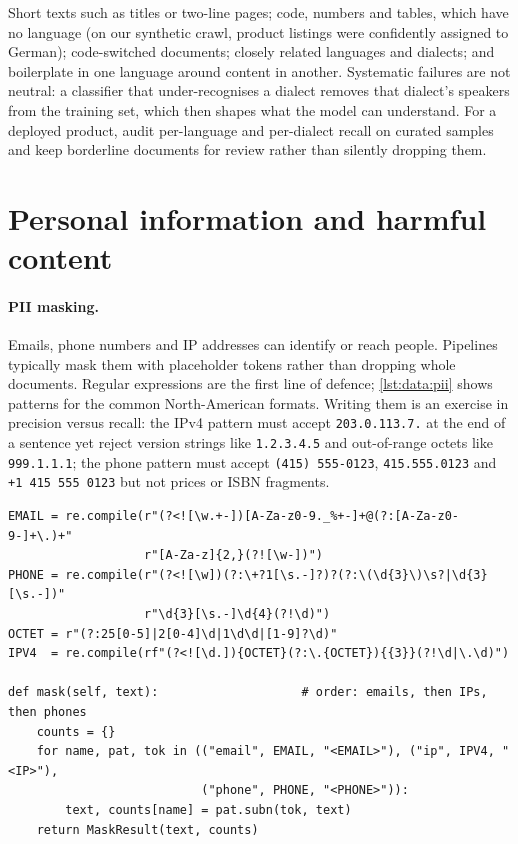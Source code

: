 \begin{pitfall}
Short texts such as titles or two-line pages; code, numbers and tables, which have no language (on
our synthetic crawl, product listings were confidently assigned to German); code-switched documents;
closely related languages and dialects; and boilerplate in one language around content in another.
Systematic failures are not neutral: a classifier that under-recognises a dialect removes that
dialect's speakers from the training set, which then shapes what the model can understand. For a
deployed product, audit per-language and per-dialect recall on curated samples and keep
borderline documents for review rather than silently dropping them.
\end{pitfall}

\section{Personal information and harmful content}\label{sec:data:pii}

\paragraph{PII masking.} Emails, phone numbers and IP addresses can identify or reach people.
Pipelines typically mask them with placeholder tokens rather than dropping whole documents.
Regular expressions are the first line of defence; \cref{lst:data:pii} shows patterns for the
common North-American formats. Writing them is an exercise in precision versus recall: the IPv4
pattern must accept \texttt{203.0.113.7.} at the end of a sentence yet reject version strings
like \texttt{1.2.3.4.5} and out-of-range octets like \texttt{999.1.1.1}; the phone pattern must
accept \texttt{(415) 555-0123}, \texttt{415.555.0123} and \texttt{+1 415 555 0123} but not
prices or ISBN fragments.

\begin{lstlisting}[caption={Conservative PII regexes (from \code{llmsys/datapipe/pii.py}).},label={lst:data:pii}]
EMAIL = re.compile(r"(?<![\w.+-])[A-Za-z0-9._%+-]+@(?:[A-Za-z0-9-]+\.)+"
                   r"[A-Za-z]{2,}(?![\w-])")
PHONE = re.compile(r"(?<![\w])(?:\+?1[\s.-]?)?(?:\(\d{3}\)\s?|\d{3}[\s.-])"
                   r"\d{3}[\s.-]\d{4}(?!\d)")
OCTET = r"(?:25[0-5]|2[0-4]\d|1\d\d|[1-9]?\d)"
IPV4  = re.compile(rf"(?<![\d.]){OCTET}(?:\.{OCTET}){{3}}(?!\d|\.\d)")

def mask(self, text):                    # order: emails, then IPs, then phones
    counts = {}
    for name, pat, tok in (("email", EMAIL, "<EMAIL>"), ("ip", IPV4, "<IP>"),
                           ("phone", PHONE, "<PHONE>")):
        text, counts[name] = pat.subn(tok, text)
    return MaskResult(text, counts)
\end{lstlisting}

